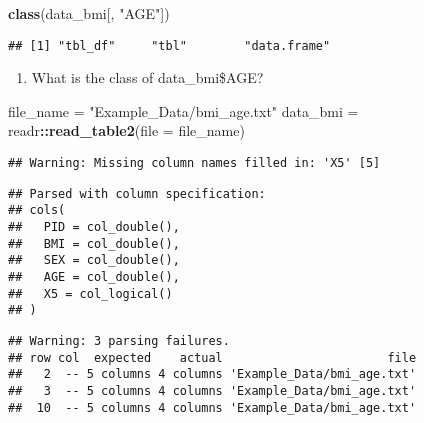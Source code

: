 \documentclass[]{article}
\newenvironment{Shaded}{\begin{snugshade}}{\end{snugshade}}
\newcommand{\DataTypeTok}[1]{\textcolor[rgb]{0.13,0.29,0.53}{#1}}
\newcommand{\KeywordTok}[1]{\textcolor[rgb]{0.13,0.29,0.53}{\textbf{#1}}}
\newcommand{\NormalTok}[1]{#1}
\newcommand{\OperatorTok}[1]{\textcolor[rgb]{0.81,0.36,0.00}{\textbf{#1}}}
\newcommand{\StringTok}[1]{\textcolor[rgb]{0.31,0.60,0.02}{#1}}
\providecommand{\tightlist}{%
  \setlength{\itemsep}{0pt}\setlength{\parskip}{0pt}}
\begin{document}
\begin{Shaded}
\begin{Highlighting}[]
\KeywordTok{class}\NormalTok{(data_bmi[, }\StringTok{"AGE"}\NormalTok{])}
\end{Highlighting}
\end{Shaded}

\begin{verbatim}
## [1] "tbl_df"     "tbl"        "data.frame"
\end{verbatim}

\begin{enumerate}
\def\labelenumi{\alph{enumi}.}
\setcounter{enumi}{2}
\tightlist
\item
  What is the class of data\_bmi\$AGE?
\end{enumerate}

\begin{Shaded}
\begin{Highlighting}[]
\NormalTok{file_name =}\StringTok{ "Example_Data/bmi_age.txt"}
\NormalTok{data_bmi =}\StringTok{ }\NormalTok{readr}\OperatorTok{::}\KeywordTok{read_table2}\NormalTok{(}\DataTypeTok{file =}\NormalTok{ file_name)}
\end{Highlighting}
\end{Shaded}

\begin{verbatim}
## Warning: Missing column names filled in: 'X5' [5]
\end{verbatim}

\begin{verbatim}
## Parsed with column specification:
## cols(
##   PID = col_double(),
##   BMI = col_double(),
##   SEX = col_double(),
##   AGE = col_double(),
##   X5 = col_logical()
## )
\end{verbatim}

\begin{verbatim}
## Warning: 3 parsing failures.
## row col  expected    actual                       file
##   2  -- 5 columns 4 columns 'Example_Data/bmi_age.txt'
##   3  -- 5 columns 4 columns 'Example_Data/bmi_age.txt'
##  10  -- 5 columns 4 columns 'Example_Data/bmi_age.txt'
\end{verbatim}

\begin{Shaded}
\end{Shaded}
\end{document}
